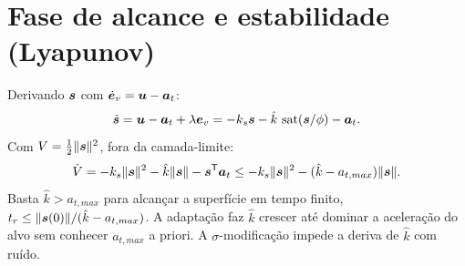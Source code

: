 \section{Fase de alcance e estabilidade (Lyapunov)}
Derivando $\bm{s}$ com $\dot{\bm{e}}_v=\bm{u}-\bm{a}_t$:
\begin{equation}
  \dot{\bm{s}} = \bm{u} - \bm{a}_t + \lambda\bm{e}_v
  = -k_s\bm{s} - \hat k\,\operatorname{sat}(\bm{s}/\phi) - \bm{a}_t .
\end{equation}
Com $V=\tfrac12\lVert\bm{s}\rVert^2$, fora da camada-limite:
\begin{equation}
  \dot V = -k_s\lVert\bm{s}\rVert^2 - \hat k\lVert\bm{s}\rVert - \bm{s}^{\mathsf{T}}\bm{a}_t
  \le -k_s\lVert\bm{s}\rVert^2 - (\hat k - a_{t,max})\lVert\bm{s}\rVert .
\end{equation}
Basta $\hat k > a_{t,max}$ para alcançar a superfície em tempo finito,
$t_r\le\lVert\bm{s}(0)\rVert/(\hat k-a_{t,max})$. A adaptação faz $\hat k$ crescer até
dominar a aceleração do alvo sem conhecer $a_{t,max}$ a priori. A
$\sigma$-modificação impede a deriva de $\hat k$ com ruído.

